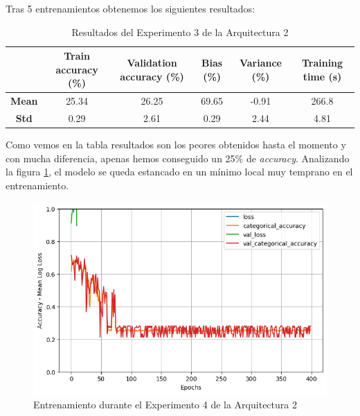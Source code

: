 \documentclass{article}
\begin{document}
			\newpage
			Tras 5 entrenamientos obtenemos los siguientes resultados:
			
			\begin{table}[!h]
				\begin{center}
					\begin{tabular}{ c | c | c | c | c | c |}
						\ & \textbf{Train accuracy (\%)} & \textbf{Validation accuracy (\%)} & \textbf{Bias (\%)} & \textbf{Variance (\%)} & \textbf{Training time (s)} \\ \hline
						\textbf{Mean} & 25.34 & 26.25 & 69.65 & -0.91 & 266.8 \\ \hline
						\textbf{Std} & 0.29 & 2.61 & 0.29 & 2.44 & 4.81 \\ \hline
					\end{tabular}
					\caption{Resultados del Experimento 3 de la Arquitectura 2}
					\label{tab:res-a2-e3}
				\end{center}
			\end{table}
			
			Como vemos en la tabla resultados son los peores obtenidos hasta el momento y con mucha diferencia, apenas hemos conseguido un 25\% de \textit{accuracy}. Analizando la figura \ref{tr-a2-e3}, el modelo se queda estancado en un m\'inimo local muy temprano en el entrenamiento.
			\begin{figure}[!h]
				\begin{center}
					\includegraphics[scale=0.5]{tr-a2-e3.png}		
					\caption{Entrenamiento durante el Experimento 4 de la Arquitectura 2}	
					\label{tr-a2-e3}
				\end{center}
			\end{figure}
			
\end{document}
